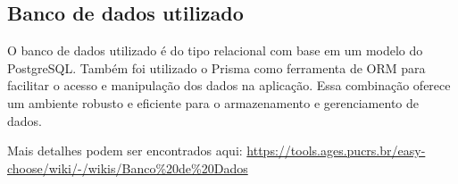 \hypertarget{__RefHeading___Toc4735_3118176633}{}
\subsection{Banco de dados utilizado\originalspace{}}
\label{ages-i:text-h-0009}

\indent \originaltab{}O banco de dados utilizado é do tipo relacional com base em um modelo do \originalinlinetab{}PostgreSQL\space\cite{ages-iv-postgresql}. Também foi utilizado o Prisma\space\cite{prisma-docs} como ferramenta de ORM para \originalinlinetab{}facilitar o acesso e manipulação dos dados na aplicação. Essa combinação \originalinlinetab{}oferece um ambiente robusto e eficiente para o armazenamento e \originalinlinetab{}gerenciamento de dados.\par

\noindent \originaltab{}Mais detalhes podem ser encontrados aqui: \url{https://tools.ages.pucrs.br/easy-choose/wiki/-/wikis/Banco%20de%20Dados}\par

